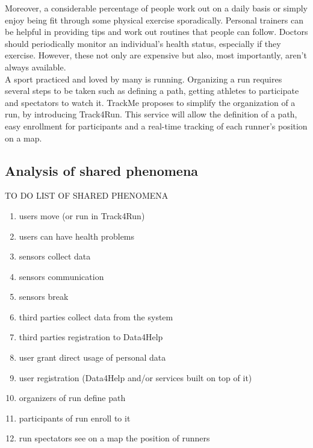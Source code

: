 \documentclass[../../rasd.tex]{subfiles}
\begin{document}
Moreover, a considerable percentage of people work out on a daily basis or simply enjoy being fit through some physical exercise sporadically. Personal trainers can be helpful in providing tips and work out routines that people can follow. Doctors should periodically monitor an individual’s health status, especially if they exercise. However, these not only are expensive but also, most importantly, aren’t always available.\\
A sport practiced and loved by many is running. Organizing a run requires several steps to be taken such as defining a path, getting athletes to participate and spectators to watch it. TrackMe proposes to simplify the organization of a run, by introducing Track4Run. This service will allow the definition of a path, easy enrollment for participants and a real-time tracking of each runner’s position on a map.
			\subsection{Analysis of shared phenomena}
			TO DO LIST OF SHARED PHENOMENA
			
		\begin{enumerate}
		\item users move (or run in Track4Run)
		\item users can have health problems
		\item sensors collect data
		\item sensors communication
		\item sensors break
		\item third parties collect data from the system
		\item third parties registration to Data4Help
		\item user grant direct usage of personal data
		\item user registration (Data4Help and/or services built on top of it)
		\item organizers of run define path
		\item participants of run enroll to it
		\item run spectators see on a map the position of runners
		
		\end{enumerate}
\end{document}
